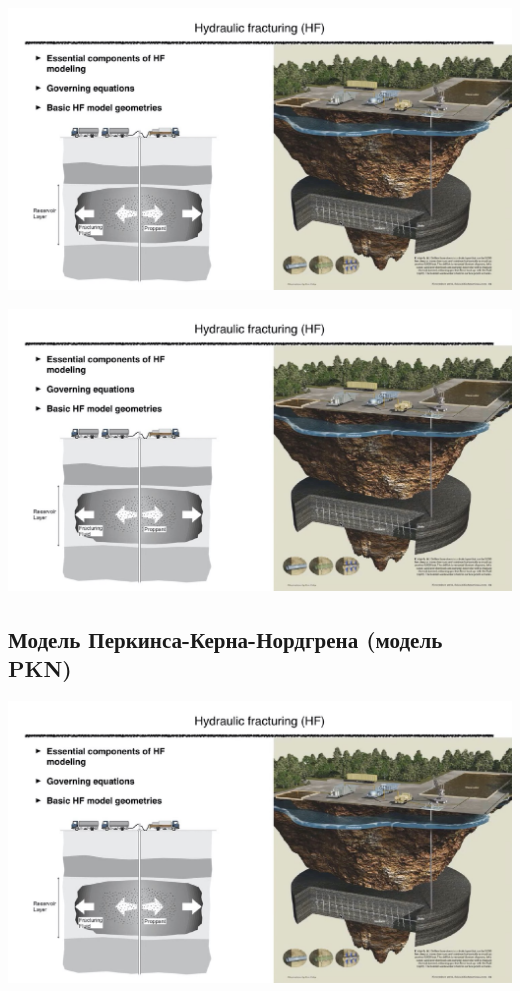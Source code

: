 \documentclass[main.tex]{subfiles}
\begin{document}
\includegraphics[width=\textwidth, page=56]{HF_slides.pdf}

\includegraphics[width=\textwidth, page=57]{HF_slides.pdf}

\subsection{Модель Перкинса-Керна-Нордгрена (модель PKN)}

\includegraphics[width=\textwidth, page=58]{HF_slides.pdf}
\end{document}
